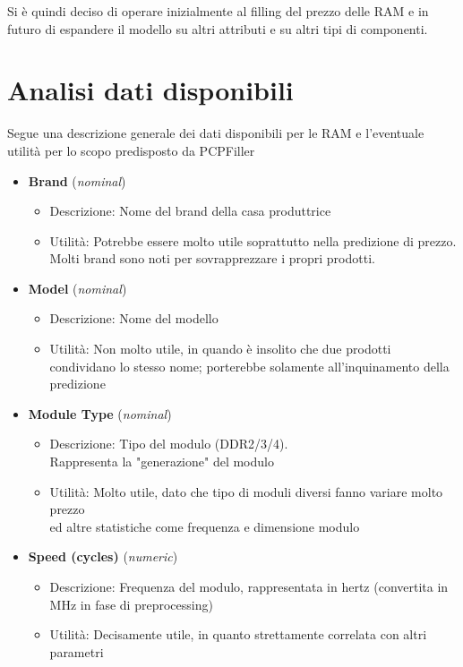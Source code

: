 \documentclass[12pt]{report}
\begin{document}
Si è quindi deciso di operare inizialmente al filling del prezzo delle RAM e in futuro di espandere
il modello su altri attributi e su altri tipi di componenti.

\newpage
\section{Analisi dati disponibili}

Segue una descrizione generale dei dati disponibili per le RAM e l'eventuale utilità per lo scopo predisposto da PCPFiller
\begin{itemize}
	\item \textbf{Brand} (\textit{nominal})
		\begin{itemize}
			\item Descrizione: Nome del brand della casa produttrice
			\item Utilità: Potrebbe essere molto utile soprattutto nella predizione di prezzo. Molti brand sono noti per sovrapprezzare i propri prodotti.
		\end{itemize}
	\item \textbf{Model} (\textit{nominal})
		\begin{itemize}
			\item Descrizione: Nome del modello
			\item Utilità: Non molto utile, in quando è insolito che due prodotti condividano lo stesso nome; porterebbe solamente all'inquinamento della predizione
		\end{itemize}
	\item \textbf{Module Type} (\textit{nominal})
		\begin{itemize}
			\item Descrizione: Tipo del modulo (DDR2/3/4).\\Rappresenta la "generazione" del modulo
			\item Utilità: Molto utile, dato che tipo di moduli diversi fanno variare molto prezzo\\ ed altre statistiche come frequenza e dimensione modulo
		\end{itemize}
	\item \textbf{Speed (cycles)} (\textit{numeric})
		\begin{itemize}
			\item Descrizione: Frequenza del modulo, rappresentata in hertz (convertita in MHz in fase di preprocessing)
			\item Utilità: Decisamente utile, in quanto strettamente correlata con altri parametri

\end{itemize}
\end{itemize}
\end{document}
